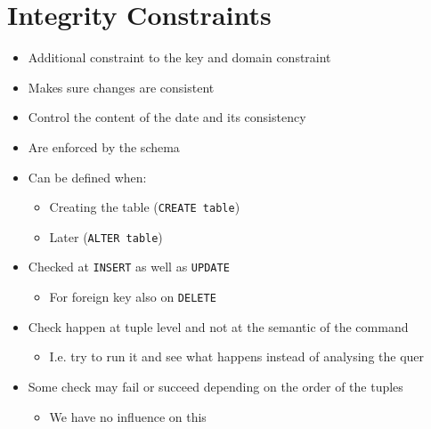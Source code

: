 
\section{Integrity Constraints}
\begin{itemize}
    \item Additional constraint to the key and domain constraint
    \item Makes sure changes are consistent
    \item Control the content of the date and its consistency
    \item Are enforced by the schema
    \item Can be defined when:
        \begin{itemize}
            \item Creating the table (\verb+CREATE table+)
            \item Later (\verb+ALTER table+)
        \end{itemize}
    \item Checked at \verb+INSERT+ as well as \verb+UPDATE+
        \begin{itemize}
            \item For foreign key also on \verb+DELETE+
        \end{itemize}
    \item Check happen at tuple level and not at the semantic of the command
        \begin{itemize}
            \item I.e. try to run it and see what happens instead of analysing the quer
        \end{itemize}
    \item Some check may fail or succeed depending on the order of the tuples
        \begin{itemize}
            \item We have no influence on this
        \end{itemize}
\end{itemize}

